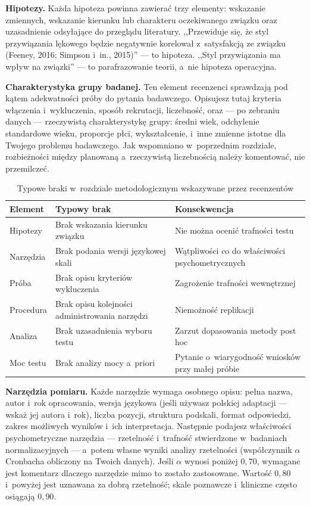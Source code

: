 \documentclass[12pt,a4paper,twoside,openany]{book}
\begin{document}
\textbf{Hipotezy.} Każda hipoteza powinna zawierać trzy elementy: wskazanie zmiennych, wskazanie kierunku lub charakteru oczekiwanego związku oraz uzasadnienie odsyłające do przeglądu literatury. ,,Przewiduje się, że styl przywiązania lękowego będzie negatywnie korelował z~satysfakcją ze związku (Feeney, 2016; Simpson i~in., 2015)'' --- to hipoteza. ,,Styl przywiązania ma wpływ na związki'' --- to parafrazowanie teorii, a~nie hipoteza operacyjna.

\textbf{Charakterystyka grupy badanej.} Ten element recenzenci sprawdzają pod kątem adekwatności próby do pytania badawczego. Opisujesz tutaj kryteria włączenia i~wykluczenia, sposób rekrutacji, liczebność, oraz --- po zebraniu danych --- rzeczywistą charakterystykę grupy: średni wiek, odchylenie standardowe wieku, proporcje płci, wykształcenie, i~inne zmienne istotne dla Twojego problemu badawczego. Jak wspomniano w~poprzednim rozdziale, rozbieżności między planowaną a~rzeczywistą liczebnością należy komentować, nie przemilczeć.

\begin{table}[ht]
\centering
\caption{Typowe braki w~rozdziale metodologicznym wskazywane przez recenzentów}
\begin{tabularx}{\textwidth}{lXl}
\toprule
\rowcolor{tableheadbg} \textcolor{tableheadfg}{\textbf{Element}} & \textcolor{tableheadfg}{\textbf{Typowy brak}} & \textcolor{tableheadfg}{\textbf{Konsekwencja}} \\
\midrule
Hipotezy & Brak wskazania kierunku związku & Nie można ocenić trafności testu \\
Narzędzia & Brak podania wersji językowej skali & Wątpliwości co do właściwości psychometrycznych \\
Próba & Brak opisu kryteriów wykluczenia & Zagrożenie trafności wewnętrznej \\
Procedura & Brak opisu kolejności administrowania narzędzi & Niemożność replikacji \\
Analiza & Brak uzasadnienia wyboru testu & Zarzut dopasowania metody post hoc \\
Moc testu & Brak analizy mocy a~priori & Pytanie o~wiarygodność wniosków przy małej próbie \\
\bottomrule
\end{tabularx}
\end{table}

\textbf{Narzędzia pomiaru.} Każde narzędzie wymaga osobnego opisu: pełna nazwa, autor i~rok opracowania, wersja językowa (jeśli używasz polskiej adaptacji --- wskaż jej autora i~rok), liczba pozycji, struktura podskali, format odpowiedzi, zakres możliwych wyników i~ich interpretacja. Następnie podajesz właściwości psychometryczne narzędzia --- rzetelność i~trafność stwierdzone w~badaniach normalizacyjnych --- a~potem własne wyniki analizy rzetelności (współczynnik $\alpha$ Cronbacha obliczony na Twoich danych). Jeśli $\alpha$ wynosi poniżej $0{,}70$, wymagane jest komentarz dlaczego narzędzie mimo to zostało zastosowane. Wartość $0{,}80$ i~powyżej jest uznawana za dobrą rzetelność; skale poznawcze i~kliniczne często osiągają $0{,}90$.
\end{document}
